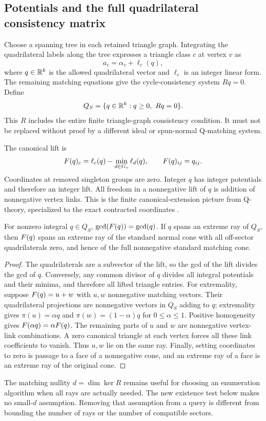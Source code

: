 \subsection{Potentials and the full quadrilateral consistency matrix}

Choose a spanning tree in each retained triangle graph. Integrating the quadrilateral labels along the tree expresses a triangle class $c$ at vertex $v$ as
\[
 a_c=\alpha_v+\ell_c(q),
\]
where $q\in\mathbb R^k$ is the allowed quadrilateral vector and $\ell_c$ is an integer linear form. The remaining matching equations give the cycle-consistency system $Rq=0$. Define
\begin{equation}\label{eq:Q}
 Q_S=\{q\in\mathbb R^k:q\ge0,\ Rq=0\}.
\end{equation}
This $R$ includes the entire finite triangle-graph consistency condition. It must not be replaced without proof by a different ideal or spun-normal Q-matching system.

The canonical lift is
\begin{equation}\label{eq:canonical-lift}
 F(q)_c=\ell_c(q)-\min_{d\in G_v}\ell_d(q),\qquad
 F(q)_{ij}=q_{ij}.
\end{equation}
Coordinates at removed singleton groups are zero. Integer $q$ has integer potentials and therefore an integer lift. All freedom in a nonnegative lift of $q$ is addition of nonnegative vertex links. This is the finite canonical-extension picture from Q-theory, specialized to the exact contracted coordinates \cite{Tollefson,BurtonQ}.

\begin{lemma}\label{lem:lift-extreme}
For nonzero integral $q\in Q_S$, $\gcd(F(q))=\gcd(q)$. If $q$ spans an extreme ray of $Q_S$, then $F(q)$ spans an extreme ray of the standard normal cone with all off-sector quadrilaterals zero, and hence of the full nonnegative standard matching cone.
\end{lemma}
\begin{proof}
The quadrilaterals are a subvector of the lift, so the gcd of the lift divides the gcd of $q$. Conversely, any common divisor of $q$ divides all integral potentials and their minima, and therefore all lifted triangle entries. For extremality, suppose $F(q)=u+w$ with $u,w$ nonnegative matching vectors. Their quadrilateral projections are nonnegative vectors in $Q_S$ adding to $q$; extremality gives $\pi(u)=\alpha q$ and $\pi(w)=(1-\alpha)q$ for $0\le\alpha\le1$. Positive homogeneity gives $F(\alpha q)=\alpha F(q)$. The remaining parts of $u$ and $w$ are nonnegative vertex-link combinations. A zero canonical triangle at each vertex forces all these link coefficients to vanish. Thus $u,w$ lie on the same ray. Finally, setting coordinates to zero is passage to a face of a nonnegative cone, and an extreme ray of a face is an extreme ray of the original cone.
\end{proof}

The matching nullity $d=\dim\ker R$ remains useful for choosing an enumeration algorithm when all rays are actually needed. The new existence test below makes no small-$d$ assumption. Removing that assumption from a query is different from bounding the number of rays or the number of compatible sectors.
